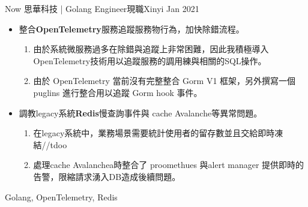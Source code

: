 %
%
%



\begin{experiences}
	\experience
	{Now}   {思華科技 | Golang Engineer}{現職}{Xinyi}
	{Jan 2021} {
                      \begin{itemize}
                      	\item 整合\textbf{OpenTelemetry}服務追蹤服務物行為，加快除錯流程。
                      		\begin{enumerate}                      	
                      			\item 由於系統微服務過多在除錯與追蹤上非常困難，因此我積極導入OpenTelemetry技術用以追蹤服務的調用練與相關的SQL操作。
                      			\item 由於 OpenTelemetry 當前沒有完整整合 Gorm  V1 框架，另外撰寫一個 puglins  進行整合用以追蹤  Gorm hook 事件。
                      		 \end{enumerate}
                      	\item 調教legacy系統\textbf{Redis}慢查詢事件與 cache Avalanche等異常問題。
	                      	\begin{enumerate}
    	                  		\item 在legacy系統中，業務場景需要統計使用者的留存數並且交給即時凍結//tdoo
        	              		\item 處理cache Avalanchea時整合了  proomethues  與alert manager 提供即時的告警，限縮請求湧入DB造成後續問題。
                      		\end{enumerate}
                      	\end{itemize}
                     }
                 {Golang, OpenTelemetry, Redis}
	\emptySeparator
	


\end{experiences}
